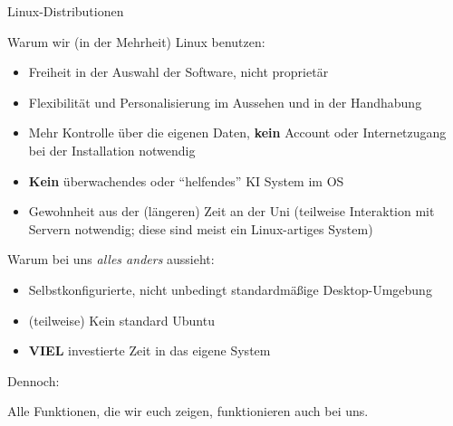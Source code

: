 \begin{frame}{Linux-Distributionen}



    Warum wir (in der Mehrheit) Linux benutzen:
    \begin{itemize}
        \item Freiheit in der Auswahl der Software, nicht proprietär
        \item Flexibilität und Personalisierung im Aussehen und in der Handhabung
        \item Mehr Kontrolle über die eigenen Daten, \textbf{kein} Account oder
          Internetzugang bei der Installation notwendig
        \item \textbf{Kein} überwachendes oder \enquote{helfendes} KI System im OS
        \item Gewohnheit aus der (längeren) Zeit an der Uni (teilweise Interaktion mit Servern
            notwendig; diese sind meist ein Linux-artiges System)
    \end{itemize}
    Warum bei uns \textit{alles anders} aussieht:
    \begin{itemize}
        \item Selbstkonfigurierte, nicht unbedingt standardmäßige Desktop-Umgebung
        \item (teilweise) Kein standard Ubuntu
        \item \textbf{VIEL} investierte Zeit in das eigene System
    \end{itemize}

    Dennoch:

    Alle Funktionen, die wir euch zeigen, funktionieren auch bei uns.

\end{frame}

